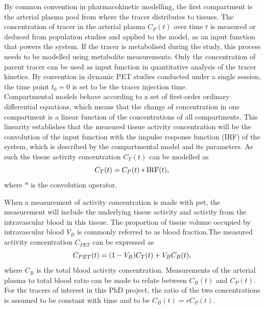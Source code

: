 By common convention in pharmacokinetic modelling, the first compartment is the arterial plasma pool from where the tracer distributes to tissues. The concentration of tracer in the arterial plasma $C_P(t)$ over time $t$ is measured or deduced from population studies and applied to the model, as an input function that powers the system.
If the tracer is metabolised during the study, this process needs to be modelled using metabolite measurements. Only the concentration of parent tracer can be used as input function in quantitative analysis of the tracer kinetics.
By convention in dynamic PET studies conducted under a single session, the time point $t_0=0$ is set to be the tracer injection time. \\
Compartmental models behave according to a set of first-order ordinary differential equations, which means that the change of concentration in one compartment is a linear function of the concentrations of all compartments. This linearity establishes that the measured tissue activity concentration will be the convolution of the input function with the impulse response function (IRF) of the system, which is described by the compartmental model and its parameters.
As such the tissue activity concentration $C_T(t)$ can be modelled as
\begin{equation}
 C_T(t) = C_P(t) \ast \textrm{IRF}(t)  \\ , \\ 
\end{equation}
where $\ast$ is the convolution operator. 

When a measurement of activity concentration is made with \gls{pet}, the measurement will include the underlying tissue activity and activity from the intravascular blood in this tissue. The proportion of tissue volume occupied by intravascular blood $V_B$ is commonly referred to as blood fraction.The measured activity concentration $C_{PET}$ can be expressed as
\begin{equation}
{C_{PET}}(t)  = (1-V_{B}){C_{T}}(t) + V_{B}C_{B}(t) \\ , \\
\label{eqn:CPET}
\end{equation}
where $C_{B}$ is the total blood activity concentration.
Measurements of the %
arterial plasma to total blood ratio can be made to relate between $C_{B}(t)$ and $C_P(t)$. 
For the tracers of interest in this PhD project, the ratio of the two concentrations is assumed to be constant with time and to be $C_{B}(t) = r C_{P}(t)$. 

